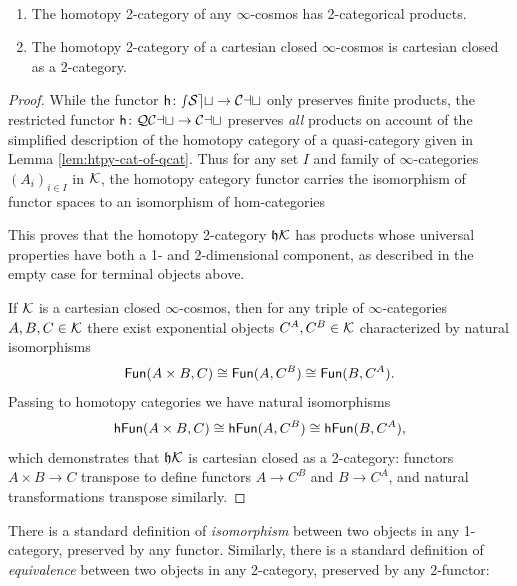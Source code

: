   \begin{proposition}\label{prop:htpy-2-cat-closure}
  $\quad$
  \begin{enumerate}
  \item The homotopy 2-category of any $\infty$-cosmos has 2-categorical products.
  \item\label{itm:cart-closed} The homotopy 2-category of a cartesian closed $\infty$-cosmos is cartesian closed as a 2-category.
  \end{enumerate}
  \end{proposition}
  \begin{proof}
  While the functor ${\mathord{\mathsf{h}}}\colon{\mathord{\mathcal{sSet}}} \to {\mathord{\mathcal{Cat}}}$ only preserves finite products, the restricted functor ${\mathord{\mathsf{h}}}\colon{\mathord{\mathcal{QCat}}}\to{\mathord{\mathcal{Cat}}}$ preserves \emph{all} products on account of the simplified description of the homotopy category of a quasi-category given in Lemma \ref{lem:htpy-cat-of-qcat}. Thus for any set $I$ and family of $\infty$-categories $(A_i)_{i \in I}$ in ${\mathord{\mathcal{K}}}$, the homotopy category functor carries the isomorphism of functor spaces  to an isomorphism of hom-categories
  \begin{center} 
  \end{center}
  This proves that the homotopy 2-category $\mathfrak{h}{\mathord{\mathcal{K}}}$ has products whose universal properties have both a 1- and 2-dimensional component, as described in the empty case for terminal objects above.

  If ${\mathord{\mathcal{K}}}$ is a cartesian closed $\infty$-cosmos, then for any triple of $\infty$-categories $A,B,C \in {\mathord{\mathcal{K}}}$ there exist exponential objects $C^A, C^B \in {\mathord{\mathcal{K}}}$ characterized by natural isomorphisms
  \[ {\mathord{\mathsf{Fun}}}(A \times B, C) \cong {\mathord{\mathsf{Fun}}}(A, C^B) \cong {\mathord{\mathsf{Fun}}}(B,C^A).\] Passing to homotopy categories we have natural isomorphisms
  \[ {\mathord{\mathsf{hFun}}}(A \times B, C) \cong {\mathord{\mathsf{hFun}}}(A, C^B) \cong {\mathord{\mathsf{hFun}}}(B,C^A),\] which demonstrates that $\mathfrak{h}{\mathord{\mathcal{K}}}$ is cartesian closed as a 2-category: functors $A \times B \to C$ transpose to define functors $A \to C^B$ and $B \to C^A$, and natural transformations transpose similarly.
  \end{proof}

  There is a standard definition of \emph{isomorphism} between two objects in any 1-category, preserved by any functor. Similarly, there is a standard definition of \emph{equivalence} between two objects in any 2-category, preserved by any 2-functor:

